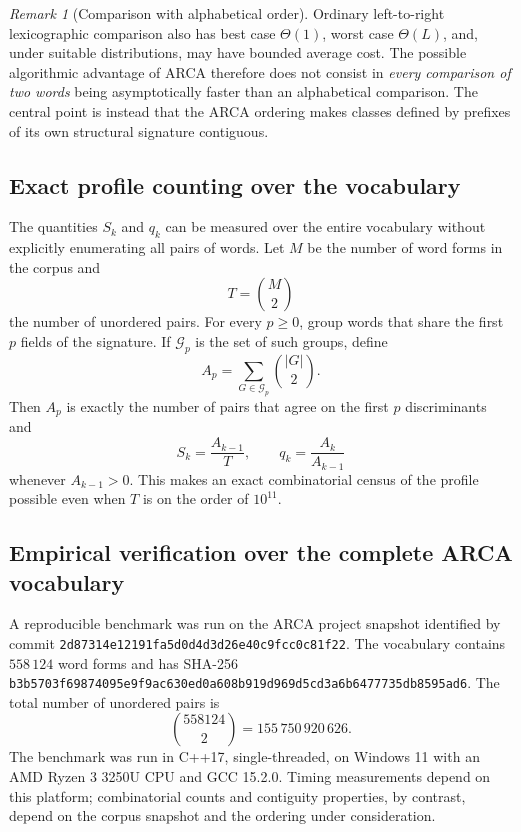 \documentclass[11pt,a4paper]{article}
\theoremstyle{definition}
\theoremstyle{remark}
\newtheorem{remark}[theorem]{Remark}
\begin{document}
\begin{remark}[Comparison with alphabetical order]
Ordinary left-to-right lexicographic comparison also has best case $\Theta(1)$, worst case $\Theta(L)$, and, under suitable distributions, may have bounded average cost. The possible algorithmic advantage of ARCA therefore does not consist in \emph{every comparison of two words} being asymptotically faster than an alphabetical comparison. The central point is instead that the ARCA ordering makes classes defined by prefixes of its own structural signature contiguous.
\end{remark}

\subsection{Exact profile counting over the vocabulary}

The quantities $S_k$ and $q_k$ can be measured over the entire vocabulary without explicitly enumerating all pairs of words. Let $M$ be the number of word forms in the corpus and
\[
  T=\binom{M}{2}
\]
the number of unordered pairs. For every $p\geq0$, group words that share the first $p$ fields of the signature. If $\mathcal{G}_p$ is the set of such groups, define
\[
  A_p=\sum_{G\in\mathcal{G}_p}\binom{|G|}{2}.
\]
Then $A_p$ is exactly the number of pairs that agree on the first $p$ discriminants and
\[
  S_k=\frac{A_{k-1}}{T},
  \qquad
  q_k=\frac{A_k}{A_{k-1}}
\]
whenever $A_{k-1}>0$. This makes an exact combinatorial census of the profile possible even when $T$ is on the order of $10^{11}$.

\subsection{Empirical verification over the complete ARCA vocabulary}

A reproducible benchmark was run on the ARCA project snapshot identified by commit
\texttt{2d87314e12191fa5d0d4d3d26e40c9fcc0c81f22}. The vocabulary contains $558\,124$ word forms and has SHA-256
\texttt{b3b5703f69874095e9f9ac630ed0a608b919d969d5cd3a6b6477735db8595ad6}. The total number of unordered pairs is
\[
  \binom{558124}{2}=155\,750\,920\,626.
\]
The benchmark was run in C++17, single-threaded, on Windows 11 with an AMD Ryzen 3 3250U CPU and GCC 15.2.0. Timing measurements depend on this platform; combinatorial counts and contiguity properties, by contrast, depend on the corpus snapshot and the ordering under consideration.
\end{document}
